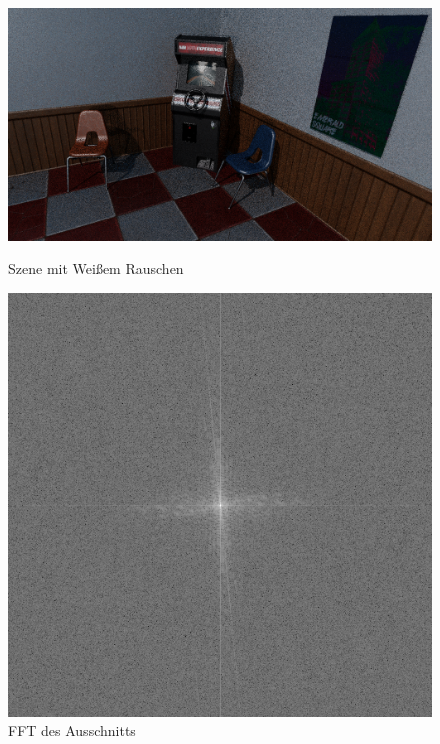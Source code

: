 \begin{figure}[H]\label{pic:WeissesRauschenTracer}
    \centering
    \begin{minipage}[t]{0.45\linewidth}
        \centering
        \includegraphics[width=\linewidth]{content/PathTracer/Bilder/WeissesRauschenSzene.png}
        \caption{Szene mit Weißem Rauschen}
    \end{minipage}
    \hfill
    \begin{minipage}[t]{0.45\linewidth}
        \centering
        \includegraphics[width=\linewidth]{content/PathTracer/Bilder/FFT_Ausschnitt2.png}
        \caption{FFT des Ausschnitts}
    \end{minipage}
\end{figure}





